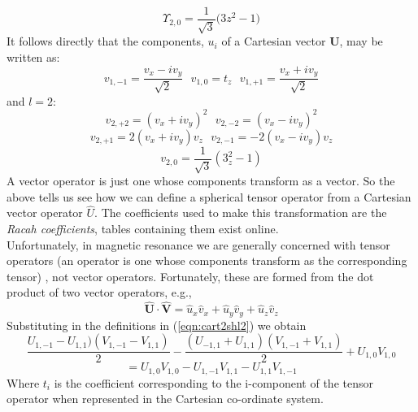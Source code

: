\documentclass[12pt]{article}
\begin{document}
\begin{equation}
 \Upsilon_{2,0} =\frac{1}{\sqrt{3}} \Bigg( 3 z^{2} -1 \Bigg )
\end{equation}
\noindent It follows directly that the components, $u_{i}$ of a Cartesian
vector $\mathbf{U}$, may be written as:
\begin{equation}
v_{1,-1} = \frac{v_{x}-iv_{y}}{\sqrt{2}} \text{\ \ \ }
v_{1,0}  = t_{z} \text{\ \ \ }
v_{1,+1} = \frac{v_{x}+iv_{y}}{\sqrt{2}}
\label{eqn:cart2shl2}
\end{equation}
and $l=2$:
\begin{equation*}
v_{2,+2} = (v_{x}+iv_{y})^{2}\text{\ \ \ }
v_{2,-2} = (v_{x}-iv_{y})^{2}
\end{equation*}
\begin{equation*}
v_{2,+1} = 2(v_{x}+iv_{y})v_{z} \text { \ \ \ }
v_{2,-1} = -2(v_{x}-iv_{y})v_{z} 
\end{equation*}
\begin{equation}
v_{2,0} =\frac{1}{\sqrt{3}} ( 3_{z}^{2} -1  )
\label{eqn:cart2shl2}
\end{equation}
\noindent A vector operator is just one whose components transform
as a vector. So the above tells us see how we can define a spherical
tensor operator from a Cartesian vector operator $\hat{U}$. The coefficients
used to make this transformation are the \emph{Racah coefficients}, 
tables containing them exist online.\\

\noindent  Unfortunately, 
in magnetic resonance we are generally concerned with tensor operators
(an operator is one whose components transform as the corresponding tensor)
, not vector operators. 
Fortunately, these are formed from the dot product of two vector operators, e.g.,
\begin{equation}
\mathbf{\hat{U}}\cdot\mathbf{\hat{V}} =
 \hat{u}_{x}\hat{v}_{x}+
 \hat{u}_{y}\hat{v}_{y}+
 \hat{u}_{z}\hat{v}_{z}
\end{equation}
\noindent Substituting in the definitions in (\ref{eqn:cart2shl2}) we obtain
\begin{equation*}
  \frac{U_{1,-1}-U_{1,1})(V_{1,-1}-V_{1,1})}{2}
- \frac{(U_{-1,1}+U_{1,1})(V_{1,-1}+V_{1,1})}{2}
+U_{1,0}V_{1,0}
\end{equation*}
\begin{equation}
=U_{1,0}V_{1,0}-U_{1,-1}V_{1,1}-U_{1,1}V_{1,-1}
\end{equation}
\noindent Where $t_{i}$ is the coefficient corresponding to the 
i-component of the tensor operator when represented in the 
Cartesian co-ordinate system.\\
\end{document}
